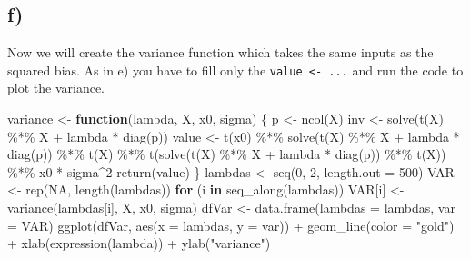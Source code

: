 \documentclass[
]{article}
\newenvironment{Shaded}{\begin{snugshade}}{\end{snugshade}}
\newcommand{\AttributeTok}[1]{\textcolor[rgb]{0.77,0.63,0.00}{#1}}
\newcommand{\ConstantTok}[1]{\textcolor[rgb]{0.00,0.00,0.00}{#1}}
\newcommand{\ControlFlowTok}[1]{\textcolor[rgb]{0.13,0.29,0.53}{\textbf{#1}}}
\newcommand{\DecValTok}[1]{\textcolor[rgb]{0.00,0.00,0.81}{#1}}
\newcommand{\FunctionTok}[1]{\textcolor[rgb]{0.00,0.00,0.00}{#1}}
\newcommand{\NormalTok}[1]{#1}
\newcommand{\OtherTok}[1]{\textcolor[rgb]{0.56,0.35,0.01}{#1}}
\newcommand{\SpecialCharTok}[1]{\textcolor[rgb]{0.00,0.00,0.00}{#1}}
\newcommand{\StringTok}[1]{\textcolor[rgb]{0.31,0.60,0.02}{#1}}
\begin{document}
\hypertarget{f}{%
\subsection{f)}\label{f}}

Now we will create the variance function which takes the same inputs as
the squared bias. As in e) you have to fill only the
\texttt{value\ \textless{}-\ ...} and run the code to plot the variance.

\begin{Shaded}
\begin{Highlighting}[]
\NormalTok{variance }\OtherTok{\textless{}{-}} \ControlFlowTok{function}\NormalTok{(lambda, X, x0, sigma) \{}
\NormalTok{  p }\OtherTok{\textless{}{-}} \FunctionTok{ncol}\NormalTok{(X)}
\NormalTok{  inv }\OtherTok{\textless{}{-}} \FunctionTok{solve}\NormalTok{(}\FunctionTok{t}\NormalTok{(X) }\SpecialCharTok{\%*\%}\NormalTok{ X }\SpecialCharTok{+}\NormalTok{ lambda }\SpecialCharTok{*} \FunctionTok{diag}\NormalTok{(p))}
\NormalTok{  value }\OtherTok{\textless{}{-}} \FunctionTok{t}\NormalTok{(x0) }\SpecialCharTok{\%*\%} \FunctionTok{solve}\NormalTok{(}\FunctionTok{t}\NormalTok{(X) }\SpecialCharTok{\%*\%}\NormalTok{ X }\SpecialCharTok{+}\NormalTok{ lambda }\SpecialCharTok{*} \FunctionTok{diag}\NormalTok{(p)) }\SpecialCharTok{\%*\%} \FunctionTok{t}\NormalTok{(X) }\SpecialCharTok{\%*\%} \FunctionTok{t}\NormalTok{(}\FunctionTok{solve}\NormalTok{(}\FunctionTok{t}\NormalTok{(X) }\SpecialCharTok{\%*\%}\NormalTok{ X }\SpecialCharTok{+}\NormalTok{ lambda }\SpecialCharTok{*} \FunctionTok{diag}\NormalTok{(p)) }\SpecialCharTok{\%*\%} \FunctionTok{t}\NormalTok{(X)) }\SpecialCharTok{\%*\%}\NormalTok{ x0 }\SpecialCharTok{*}\NormalTok{ sigma}\SpecialCharTok{\^{}}\DecValTok{2}
  \FunctionTok{return}\NormalTok{(value)}
\NormalTok{\}}
\NormalTok{lambdas }\OtherTok{\textless{}{-}} \FunctionTok{seq}\NormalTok{(}\DecValTok{0}\NormalTok{, }\DecValTok{2}\NormalTok{, }\AttributeTok{length.out =} \DecValTok{500}\NormalTok{)}
\NormalTok{VAR }\OtherTok{\textless{}{-}} \FunctionTok{rep}\NormalTok{(}\ConstantTok{NA}\NormalTok{, }\FunctionTok{length}\NormalTok{(lambdas))}
\ControlFlowTok{for}\NormalTok{ (i }\ControlFlowTok{in} \FunctionTok{seq\_along}\NormalTok{(lambdas)) VAR[i] }\OtherTok{\textless{}{-}} \FunctionTok{variance}\NormalTok{(lambdas[i], X, x0, sigma)}
\NormalTok{dfVar }\OtherTok{\textless{}{-}} \FunctionTok{data.frame}\NormalTok{(}\AttributeTok{lambdas =}\NormalTok{ lambdas, }\AttributeTok{var =}\NormalTok{ VAR)}
\FunctionTok{ggplot}\NormalTok{(dfVar, }\FunctionTok{aes}\NormalTok{(}\AttributeTok{x =}\NormalTok{ lambdas, }\AttributeTok{y =}\NormalTok{ var)) }\SpecialCharTok{+}
  \FunctionTok{geom\_line}\NormalTok{(}\AttributeTok{color =} \StringTok{"gold"}\NormalTok{) }\SpecialCharTok{+}
  \FunctionTok{xlab}\NormalTok{(}\FunctionTok{expression}\NormalTok{(lambda)) }\SpecialCharTok{+}
  \FunctionTok{ylab}\NormalTok{(}\StringTok{"variance"}\NormalTok{)}
\end{Highlighting}
\end{Shaded}
\end{document}
